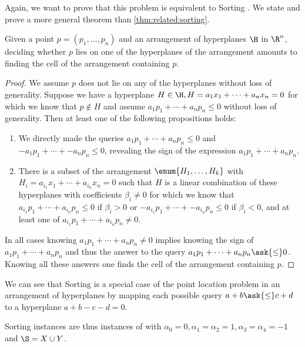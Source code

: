 Again, we want to prove that this problem is equivalent to Sorting \XY. We
state and prove a more general theorem than \ref{thm:related:sorting}.
\begin{theorem}\label{thm:related:sortingxy}
Given a point \(p = (p_1, \ldots, p_n)\) and an arrangement of hyperplanes
\(\H\) in \(\R^n\), deciding whether \(p\) lies on one of the hyperplanes of the
arrangement amounts to finding the cell of the arrangement containing \(p\).
\end{theorem}
\begin{proof}
We assume \(p\) does not lie on any of the hyperplanes without loss of generality.
Suppose we have a hyperplane \(H \in \H, H = a_1 x_1 + \cdots + a_n x_n = 0\) for which we
know that \(p \notin H\) and assume \(a_1 p_1 + \cdots + a_n p_n \le 0\)
without loss of generality.
Then at least one of the following propositions holds:
\begin{enumerate}
\item We directly made the queries \(a_1 p_1 + \cdots + a_n p_n \le 0\) and
\(-a_1 p_1 + \cdots + -a_n p_n \le 0\), revealing the sign of the expression
\(a_1 p_1 + \cdots + a_n p_n\).
\item There is a subset of the arrangement \(\enum{H_1,\ldots,H_k}\) with
\(H_i = a_{i_1} x_1 + \cdots + a_{i_n} x_n = 0\) such that \(H\) is a linear
combination of these hyperplanes with coefficients \(\beta_i \neq 0\) for which we
know that \(a_{i_1} p_1 + \cdots + a_{i_n} p_n \le 0\) if \(\beta_i > 0\) or
\(-a_{i_1} p_1 + \cdots + -a_{i_n} p_n \le 0\) if \(\beta_i < 0\), and at
least one of \(a_{i_1} p_1 + \cdots + a_{i_n} p_n \neq 0\).
\end{enumerate}
In all cases knowing \(a_1 p_1 + \cdots + a_n p_n \neq 0\) implies knowing the
sign of \(a_1 p_1 + \cdots + a_n p_n\) and thus the answer to the query \(a_1
p_1 + \cdots + a_n p_n \ask{\le} 0\). Knowing all these answers one finds the
cell of the arrangement containing \(p\).
\end{proof}

We can see that Sorting \XY is a special case of the point location problem in
an arrangement of hyperplanes by mapping each possible query $a + b \ask{\le} c
+ d$ to a hyperplane $a + b - c - d = 0$.

Sorting \XY instances are thus instances of \fourLDT
with $\alpha_0 = 0, \alpha_1 = \alpha_2 = 1, \alpha_3 = \alpha_4 = -1$ and
$\S = X \cup Y$.
